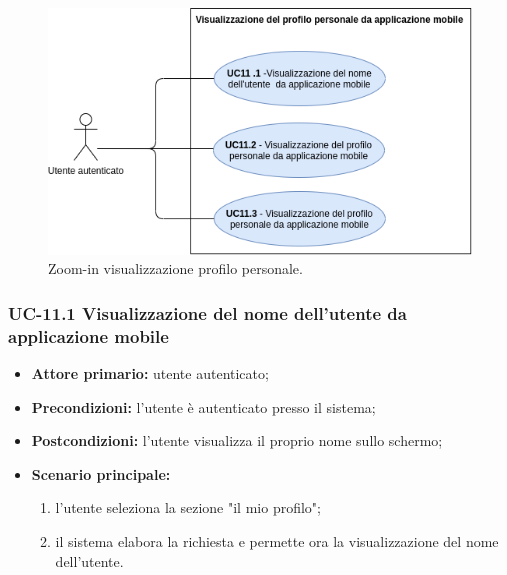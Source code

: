 \begin{figure}[H]
	\centering
	\includegraphics[width=\textwidth]{src/CasiDUso/immagini/SottocasiVisualizzazioneProfilo.png}
	\caption{Zoom-in visualizzazione profilo personale.}
\end{figure}

\subsubsection{UC-11.1 Visualizzazione del nome dell'utente da applicazione mobile}
\begin{itemize}
	\item \textbf{Attore primario:} utente autenticato;

	\item \textbf{Precondizioni:} l'utente è autenticato presso il sistema;

	\item \textbf{Postcondizioni:} l'utente visualizza il proprio nome sullo schermo;

	\item \textbf{Scenario principale:}
		\begin{enumerate}
    		\item  l'utente seleziona la sezione "il mio profilo";
    		\item  il sistema elabora la richiesta e permette ora la visualizzazione del nome dell'utente.
		\end{enumerate}
\end{itemize}

